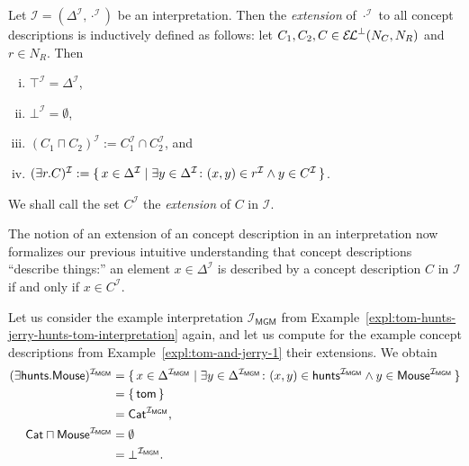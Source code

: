 \begin{Definition}
  \label{def:extending-the-interpretation-function}
  Let $\mathcal{I} = (\Delta^{\mathcal{I}}, \cdot^{\mathcal{I}})$ be an interpretation.
  Then the \emph{extension} of $\cdot^{\mathcal{I}}$ to all \ELbot concept descriptions is
  inductively defined as follows: let $C_1, C_2, C \in {\ensuremath{{\mathcal{E}\kern-.3ex\mathcal{L}}^\bot}}(N_C, N_R)$ and $r \in N_R$.
  Then
  \begin{enumerate}[i. ]
  \item $\top^{\mathcal{I}} = \Delta^{\mathcal{I}}$,
  \item $\bot^{\mathcal{I}} = \emptyset$,
  \item $(C_1 \sqcap C_2)^{\mathcal{I}} := C_1^{\mathcal{I}} \cap C_2^{\mathcal{I}}$, and
  \item $(\exists r. C)^{\mathcal{I}} := {\{\, x \in \Delta^{\mathcal{I}} \mid \exists y
      \in \Delta^{\mathcal{I}} \colon (x, y) \in r^{\mathcal{I}} \land y \in C^{\mathcal{I}} \,\}}$.
  \end{enumerate}
  We shall call the set $C^{\mathcal{I}}$ the \emph{extension} of $C$ in $\mathcal{I}$.
\end{Definition}

The notion of an extension of an \ELbot concept description in an interpretation now
formalizes our previous intuitive understanding that concept descriptions ``describe
things:'' an element $x \in \Delta^{\mathcal{I}}$ is described by a \ELbot concept
description $C$ in $\mathcal{I}$ if and only if $x \in C^{\mathcal{I}}$.

\begin{Example}
  \label{expl:tom-and-jerry-2}
  Let us consider the example interpretation $\mathcal{I}_{\mathsf{MGM}}$ from
  Example~\ref{expl:tom-hunts-jerry-hunts-tom-interpretation} again, and let us compute
  for the example \ELbot concept descriptions from Example~\ref{expl:tom-and-jerry-1}
  their extensions.  We obtain
  \begin{align*}
    (\mathsf{\exists hunts. Mouse})^{\mathcal{I}_{\mathsf{MGM}}} &= {\{\, x \in
      \Delta^{\mathcal{I}_{\mathsf{MGM}}} \mid \exists y \in
      \Delta^{\mathcal{I}_{\mathsf{MGM}}} \colon (x, y) \in
      \mathsf{hunts}^{\mathcal{I}_{\mathsf{MGM}}} \land y \in
      \mathsf{Mouse}^{\mathcal{I}_{\mathsf{MGM}}} \,\}}\\
    &= {\{\, \mathsf{tom} \,\}} \\
    &= \mathsf{Cat}^{\mathcal{I}_{\mathsf{MGM}}},\\
    \mathsf{Cat \sqcap Mouse}^{\mathcal{I}_{\mathsf{MGM}}} &= \emptyset \\
    &= \bot^{\mathcal{I}_{\mathsf{MGM}}}.
  \end{align*}
\end{Example}


